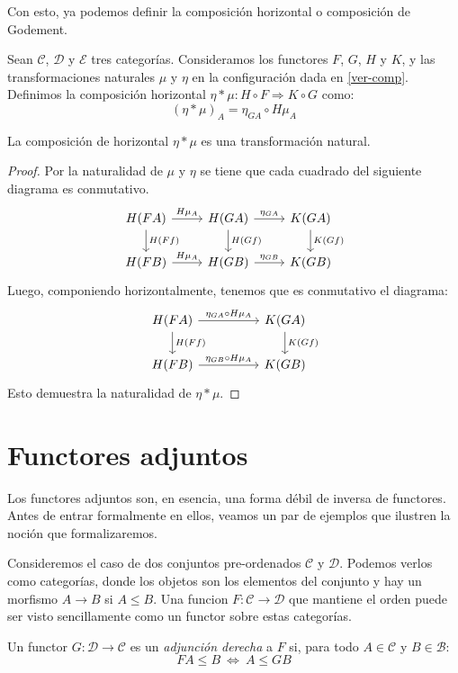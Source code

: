 \documentclass[12pt, twoside]{book}
\newcommand{\newterm}[1]{\index{#1}\emph{#1}}
\newcommand{\cat}{{\mathcal{C}}}
\newcommand{\sii}{{\ \Leftrightarrow\ }}
\begin{document}
Con esto, ya podemos definir la composición horizontal o composición de Godement.
\begin{definition}
Sean $\cat$, $\mathcal{D}$ y $\mathcal{E}$ tres categorías.
Consideramos los functores $F$, $G$, $H$ y $K$, y las transformaciones naturales $\mu$ y $\eta$ en la configuración dada en \ref{ver-comp}.
Definimos la composición horizontal $\eta * \mu \colon H \circ F \Rightarrow K \circ G$ como:
\[ (\eta * \mu)_A = \eta_{G A} \circ H\mu_A \]
\end{definition}
\begin{proposition}
La composición de horizontal $\eta * \mu$ es una transformación natural.
\end{proposition}
\begin{proof}
Por la naturalidad de $\mu$ y $\eta$ se tiene que cada cuadrado del siguiente diagrama es conmutativo.
\[\begin{tikzcd}
{H(F A)} \arrow[r,"H\mu_A"] \arrow[d,"H(F f)"] & {H(G A)} \arrow[r,"\eta_{G A}"] \arrow[d,"H(G f)"] & {K(G A)} \arrow[d,"K(G f)"]\\
{H(F B)} \arrow[r,"H\mu_A"] & {H(G B)} \arrow[r,"\eta_{G B}"] & {K(G B)}
\end{tikzcd}\]
Luego, componiendo horizontalmente, tenemos que es conmutativo el diagrama:
\[\begin{tikzcd}
{H(F A)} \arrow[rr,"\eta_{G A} \circ H\mu_A"] \arrow[d,"H(F f)"] & & {K(G A)} \arrow[d,"K(G f)"]\\
{H(F B)} \arrow[rr,"\eta_{G B} \circ H\mu_A"] & & {K(G B)}
\end{tikzcd}\]
Esto demuestra la naturalidad de $\eta * \mu$.
\end{proof}

\section{Functores adjuntos}
Los functores adjuntos son, en esencia, una forma débil de inversa de functores.
Antes de entrar formalmente en ellos, veamos un par de ejemplos que ilustren la noción que formalizaremos.

\begin{example}
Consideremos el caso de dos conjuntos pre-ordenados $\cat$ y $\mathcal{D}$.
Podemos verlos como categorías, donde los objetos son los elementos del conjunto y hay un morfismo $A \to B$ si $A \leq B$.
Una funcion $F \colon \cat \to \mathcal{D}$ que mantiene el orden puede ser visto sencillamente como un functor sobre estas categorías.

Un functor $G \colon \mathcal{D} \to \cat$ es un \newterm{adjunción derecha} a $F$ si, para todo $A \in \cat$ y $B \in \mathcal{B}$:
\[ F A \leq B \sii A \leq G B \]
\end{example}
\end{document}
